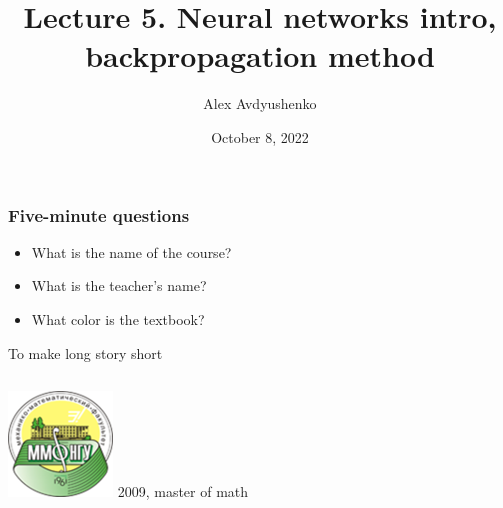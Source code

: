 \documentclass[fullscreen=true, bookmarks=true, hyperref={pdfencoding=unicode}]{beamer}
\title{Lecture 5. Neural networks intro, backpropagation method}
\author{Alex Avdyushenko}
\institute{Kazakh-British Technical University}
\date{October 8, 2022}
\begin{document}

\begin{frame}
\transdissolve[duration=0.2]
\titlepage
\end{frame}

\begin{frame}
  \frametitle{Five-minute questions}
  \pause
  \begin{itemize}
    \item What is the name of the course?
    \item What is the teacher's name?
    \item What color is the textbook?
  \end{itemize}
\end{frame}

\begin{frame}{To make long story short}
\begin{columns}
    \small
    \begin{column}{.15\paperwidth}
      \includegraphics[keepaspectratio,       width=.15\paperwidth]{mmf.png}
      2009, master of math
      

\end{column}
\end{columns}
\end{frame}
\end{document}
